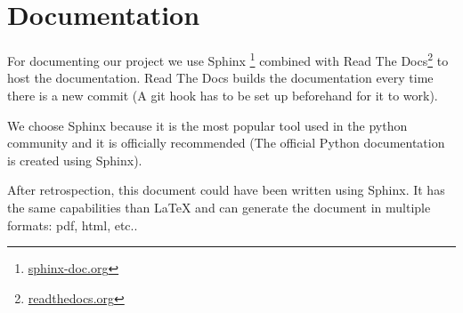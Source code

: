 \section{Documentation}

For documenting our project we use Sphinx
\footnote{\href{http://www.sphinx-doc.org}{sphinx-doc.org}} combined with Read
The Docs\footnote{\href{https://readthedocs.org}{readthedocs.org}} to host the
documentation. Read The Docs builds the documentation every time there is a new
commit (A git hook has to be set up beforehand for it to work).

We choose Sphinx because it is the most popular tool used in the python
community and it is officially recommended (The official Python documentation is
created using Sphinx).

After retrospection, this document could have been written using Sphinx. It has
the same capabilities than \LaTeX{} and can generate the document in multiple
formats: pdf, html, etc..
